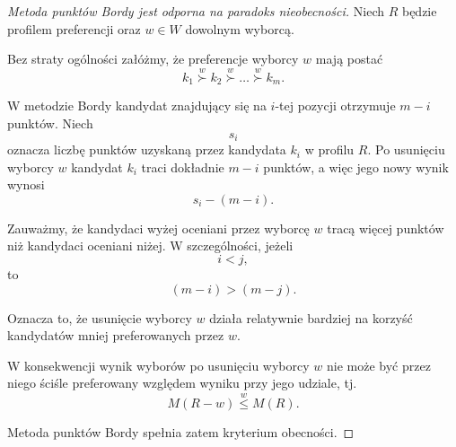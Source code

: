 \documentclass[12pt,a4paper]{mwrep}
\begin{document}
	\begin{proof}[Metoda punktów Bordy jest odporna na paradoks nieobecności]
		Niech \(R\) będzie profilem preferencji oraz \(w \in W\) dowolnym wyborcą.
		
		Bez straty ogólności załóżmy, że preferencje wyborcy \(w\) mają postać
		\[
		k_1 \overset{w}{\succ} k_2 \overset{w}{\succ} \dots \overset{w}{\succ} k_m.
		\]
		
		W metodzie Bordy kandydat znajdujący się na \(i\)-tej pozycji otrzymuje \(m-i\) punktów. Niech
		\[
		s_i
		\]
		oznacza liczbę punktów uzyskaną przez kandydata \(k_i\) w profilu \(R\). Po usunięciu wyborcy \(w\) kandydat \(k_i\) traci dokładnie \(m-i\) punktów, a więc jego nowy wynik wynosi
		\[
		s_i-(m-i).
		\]
		
		Zauważmy, że kandydaci wyżej oceniani przez wyborcę \(w\) tracą więcej punktów niż kandydaci oceniani niżej. W szczególności, jeżeli
		\[
		i<j,
		\]
		to
		\[
		(m-i) > (m-j).
		\]
		
		Oznacza to, że usunięcie wyborcy \(w\) działa relatywnie bardziej na korzyść kandydatów mniej preferowanych przez \(w\).
		
		W konsekwencji wynik wyborów po usunięciu wyborcy \(w\) nie może być przez niego ściśle preferowany względem wyniku przy jego udziale, tj.
		\[
		M(R-w)\overset{w}{\leq} M(R).
		\]
		
		Metoda punktów Bordy spełnia zatem kryterium obecności.
	\end{proof}
	
\end{document}
